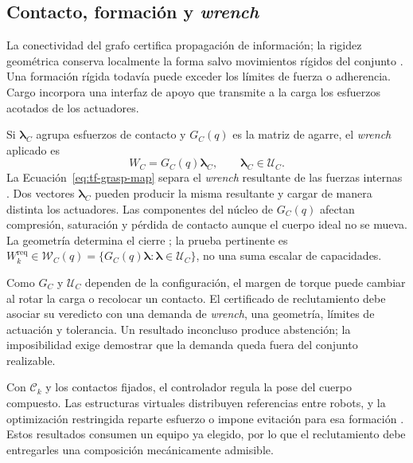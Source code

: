 \subsection{Contacto, formación y \emph{wrench}}
\label{subsec:tf-rigidity-wrench}

La conectividad del grafo certifica propagación de información; la rigidez geométrica conserva localmente la forma salvo movimientos rígidos del conjunto \parencite{desai2001formation,bullo2009distributed}. Una formación rígida todavía puede exceder los límites de fuerza o adherencia. Cargo incorpora una interfaz de apoyo que transmite a la carga los esfuerzos acotados de los actuadores.

Si $\boldsymbol\lambda_C$ agrupa esfuerzos de contacto y $G_C(q)$ es la matriz de agarre, el \emph{wrench} aplicado es
\begin{equation}
  W_C=G_C(q)\boldsymbol\lambda_C,
  \qquad \boldsymbol\lambda_C\in\mathcal U_C.
  \label{eq:tf-grasp-map}
\end{equation}
La Ecuación~\eqref{eq:tf-grasp-map} separa el \emph{wrench} resultante de las fuerzas internas \parencite{nakamura1989dynamics,yoshikawa1993coordinated}. Dos vectores \(\boldsymbol\lambda_C\) pueden producir la misma resultante y cargar de manera distinta los actuadores. Las componentes del núcleo de \(G_C(q)\) afectan compresión, saturación y pérdida de contacto aunque el cuerpo ideal no se mueva. La geometría determina el cierre \parencite{bicchi1995closure}; la prueba pertinente es \(W_k^{\mathrm{req}}\in\mathcal W_C(q)=\{G_C(q)\boldsymbol\lambda:\boldsymbol\lambda\in\mathcal U_C\}\), no una suma escalar de capacidades.

Como \(G_C\) y \(\mathcal U_C\) dependen de la configuración, el margen de torque puede cambiar al rotar la carga o recolocar un contacto. El certificado de reclutamiento debe asociar su veredicto con una demanda de \emph{wrench}, una geometría, límites de actuación y tolerancia. Un resultado inconcluso produce abstención; la imposibilidad exige demostrar que la demanda queda fuera del conjunto realizable.

Con \(\mathcal C_k\) y los contactos fijados, el controlador regula la pose del cuerpo compuesto. Las estructuras virtuales distribuyen referencias entre robots, y la optimización restringida reparte esfuerzo o impone evitación para esa formación \parencite{alonsomora2017transport,ebel2024cooperative}. Estos resultados consumen un equipo ya elegido, por lo que el reclutamiento debe entregarles una composición mecánicamente admisible.

